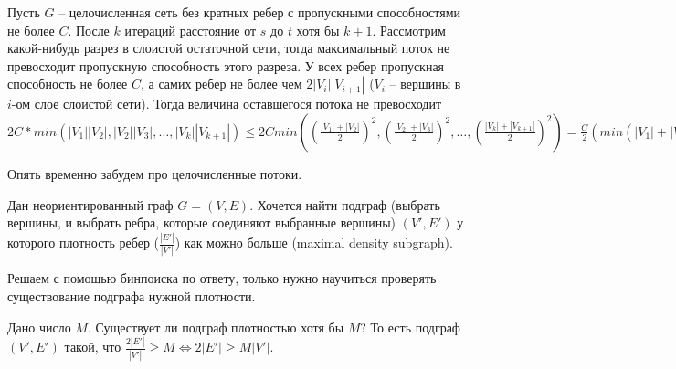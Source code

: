\begin{theorem}
    Пусть $G$ -- целочисленная сеть без кратных ребер с пропускными способностями не более $C$. После $k$ итераций расстояние от $s$ до $t$ хотя бы $k+1$. Рассмотрим какой-нибудь разрез в слоистой остаточной сети, тогда максимальный поток не превосходит пропускную способность этого разреза. У всех ребер пропускная способность не более $C$, а самих ребер не более чем $2|V_i||V_{i+1}|$ ($V_i$ -- вершины в $i$-ом слое слоистой сети). Тогда величина оставшегося потока не превосходит \\ $2C * min(|V_1||V_2|, |V_2||V_3|, \ldots, |V_k||V_{k+1}|) \leq 2C min((\frac{|V_1| + |V_2|}{2})^2, (\frac{|V_2| + |V_3|}{2})^2, \ldots, (\frac{|V_k| + |V_{k+1}|}{2})^2) = \frac{C}{2}(min(|V_1| + |V_2|, |V_2| + |V_3|, \ldots, |V_k| + |V_{k+1}|))^2 \leq \frac{C}{2}(\frac{\sum_{i=1}^{k}(V_i + |V_{i+1})}{k})^2 \leq \frac{C}{2}(\frac{2|V|}{k}^2) = 2C \frac{|V|^2}{k^2}$
\end{theorem}

\noindent Опять временно забудем про целочисленные потоки.

\begin{problem}
    Дан неориентированный граф $G = (V, E)$. Хочется найти подграф (выбрать вершины, и выбрать ребра, которые соединяют выбранные вершины) $(V', E')$ у которого плотность ребер ($\frac{|E'|}{|V'|}$) как можно больше (maximal density subgraph).
\end{problem}

\begin{solution}
    Решаем с помощью бинпоиска по ответу, только нужно научиться проверять существование подграфа нужной плотности.
\end{solution}

\begin{problem}
    Дано число $M$. Существует ли подграф плотностью хотя бы $M$? То есть подграф $(V', E')$ такой, что $\frac{2|E'|}{|V'|} \geq M \Longleftrightarrow 2|E'| \geq M|V'|$.
\end{problem}

